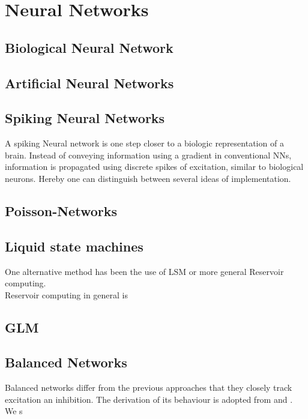 \section{Neural Networks}

\subsection{Biological Neural Network}

\subsection{Artificial Neural Networks}
\subsection{Spiking Neural Networks}
A spiking Neural network is one step closer to a biologic representation of a brain. Instead of conveying information using a gradient in conventional \ac{NN}s, information is propagated using discrete spikes of excitation, similar to biological neurons. Hereby one can distinguish between several ideas of implementation.

\subsection{Poisson-Networks}

\subsection{Liquid state machines}
One alternative method has been the use of \ac{LSM} or more general Reservoir computing.\\
Reservoir computing in general is

\subsection{GLM}

\subsection{Balanced Networks}
Balanced networks differ from the previous approaches that they closely track excitation an inhibition. The derivation of its behaviour is adopted from \cite{boerlin_predictive_2013} and \cite{huang_optimizing_2017}.\\
We s

